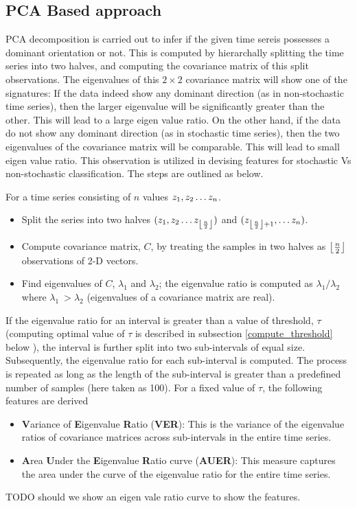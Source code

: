 \documentclass[journal]{IEEEtran}
\DeclarePairedDelimiter\floor{\lfloor}{\rfloor}
\begin{document}
	\subsection{PCA Based approach}
	
	PCA  decomposition is carried out to infer if the given time sereis possesses a dominant orientation or not. This is computed by hierarchally splitting the time series into two halves, and computing the covariance matrix of this split observations. The eigenvalues of this $2 \times 2$ covariance matrix will show one of the signatures: If the data indeed show any dominant direction (as in non-stochastic time series), then the larger eigenvalue will be significantly greater than the other. This will lead to a large eigen value ratio. On the other hand, if the data do not show any dominant direction (as in stochastic time series), then the two eigenvalues of the covariance matrix will be comparable. This will lead to small eigen value ratio. This observation is utilized in devising features for stochastic Vs non-stochastic classification. The steps are outlined as below.
	
	For a time series consisting of $n$ values  $z_1, z_2 \mathellipsis z_n$.
	\begin{itemize}
		\item  Split the series into two halves $(z_1, z_2 \mathellipsis z_{\floor*{\frac{n}{2}}})$ and $(z_{\floor*{\frac{n}{2}} + 1}, \mathellipsis z_n)$.
		\item Compute covariance matrix, $C$,  by treating the samples in two halves as $\floor*{\frac{n}{2}}$ observations of 2-D vectors.
		\item Find eigenvalues of $C$, $\lambda_1$ and $\lambda_2$; the eigenvalue ratio is computed as  $\lambda_1/\lambda_2$ where $\lambda_1 \ > \lambda_2$ (eigenvalues of a covariance matrix are real).
	\end{itemize}
	If the eigenvalue ratio for an interval is greater than a value of threshold, $\tau$ (computing optimal value of $\tau$ is described in subsection \ref{compute_threshold} below ), the interval is further split into two sub-intervals of equal size.  Subsequently, the eigenvalue ratio for each sub-interval is computed. The process is repeated as long as the length of the sub-interval is greater than a predefined number of samples (here taken as 100).
	For a fixed value of $\tau$, the following features are derived
	\begin{itemize}
		\item \textbf{V}ariance of \textbf{E}igenvalue \textbf{R}atio (\textbf{VER}): This is the variance of the eigenvalue ratios of covariance matrices across sub-intervals in the entire time series.
		\item \textbf{A}rea \textbf{U}nder the \textbf{E}igenvalue \textbf{R}atio curve (\textbf{AUER}): This measure captures the area under the curve of the eigenvalue ratio for the entire time series.
	\end{itemize}
	TODO should we show an eigen vale ratio curve to show the features.
\end{document}
